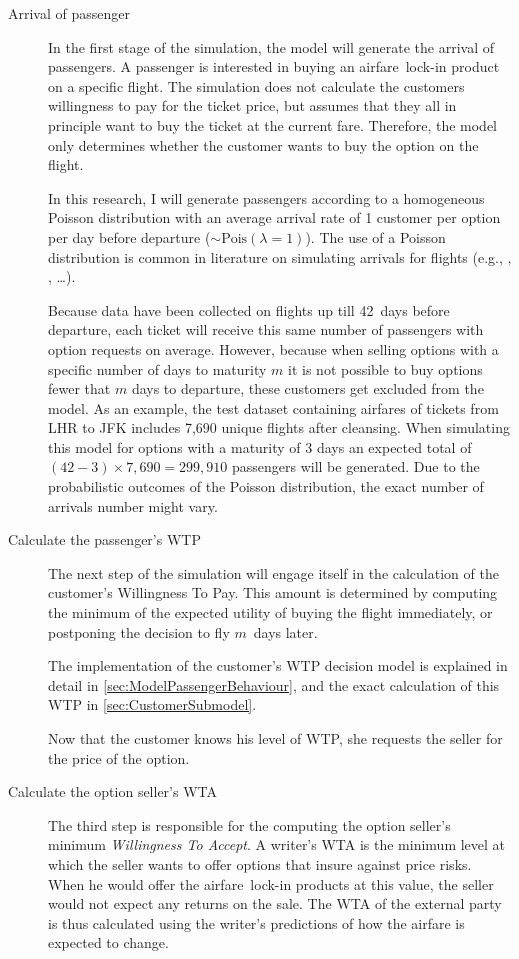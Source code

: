 \begin{description}
\item[Arrival of passenger] In the first stage of the simulation, the model will generate the arrival of passengers. A passenger is interested in buying an airfare~lock-in product on a specific flight. The simulation does not calculate the customers willingness to pay for the ticket price, but assumes that they all in principle want to buy the ticket at the current fare. Therefore, the model only determines whether the customer wants to buy the option on the flight.

In this research, I will generate passengers according to a homogeneous Poisson distribution with an average arrival rate of 1 customer per option per day before departure ($\sim \mbox{Pois}(\lambda=1)$). The use of a Poisson distribution is common in literature on simulating arrivals for flights (e.g., , , \ldots).

Because data have been collected on flights up till 42~days before departure, each ticket will receive this same number of passengers with option requests on average. However, because when selling options with a specific number of days to maturity $m$ it is not possible to buy options fewer that $m$ days to departure, these customers get excluded from the model. As an example, the test dataset containing airfares of tickets from LHR to JFK includes 7,690 unique flights after cleansing. When simulating this model for options with a maturity of 3 days an expected total of $(42 - 3) \times 7,690 = 299,910$ passengers will be generated. Due to the probabilistic outcomes of the Poisson distribution, the exact number of arrivals number might vary.

\item[Calculate the passenger's WTP] The next step of the simulation will engage itself in the calculation of the customer's Willingness To Pay. This amount is determined by computing the minimum of the expected utility of buying the flight immediately, or postponing the decision to fly $m$~days later.

The implementation of the customer's WTP decision model is explained in detail in \autoref{sec:ModelPassengerBehaviour}, and the exact calculation of this WTP in \autoref{sec:CustomerSubmodel}.

Now that the customer knows his level of WTP, she requests the seller for the price of the option.

\item[Calculate the option seller's WTA] The third step is responsible for the computing the option seller's minimum \emph{Willingness To Accept}. A writer's WTA is the minimum level at which the seller wants to offer options that insure against price risks. When he would offer the airfare~lock-in products at this value, the seller would not expect any returns on the sale. The WTA of the external party is thus calculated using the writer's predictions of how the airfare is expected to change.


\end{description}
